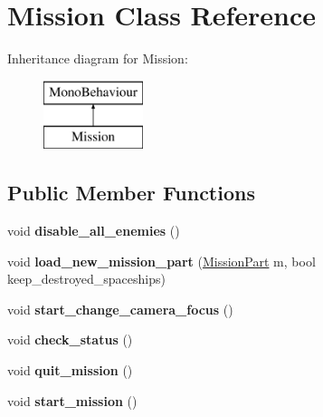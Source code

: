 \hypertarget{class_mission}{}\section{Mission Class Reference}
\label{class_mission}
Inheritance diagram for Mission\+:\begin{figure}[H]
\begin{center}
\leavevmode
\includegraphics[height=2.000000cm]{class_mission}
\end{center}
\end{figure}
\subsection*{Public Member Functions}
\begin{DoxyCompactItemize}
\item 
\mbox{\label{class_mission_ad59e9b9c65b611f73b36f6f637c69f4c}} 
void {\bfseries disable\+\_\+all\+\_\+enemies} ()
\item 
\mbox{\label{class_mission_ae952b8f9de6ba1cf5a4b6b7545b007e1}} 
void {\bfseries load\+\_\+new\+\_\+mission\+\_\+part} (\hyperlink{class_mission_part}{Mission\+Part} m, bool keep\+\_\+destroyed\+\_\+spaceships)
\item 
\mbox{\label{class_mission_a17df837067548e1008b0e61da6ea1c30}} 
void {\bfseries start\+\_\+change\+\_\+camera\+\_\+focus} ()
\item 
\mbox{\label{class_mission_a78d4acd4bb6740d22eafdc3339926a0e}} 
void {\bfseries check\+\_\+status} ()
\item 
\mbox{\label{class_mission_a446a3df52e395307c2835f39672f4b19}} 
void {\bfseries quit\+\_\+mission} ()
\item 
\mbox{\label{class_mission_a465f5f4e76c4626e2044d7680ed64faf}} 
void {\bfseries start\+\_\+mission} ()
\end{DoxyCompactItemize}
